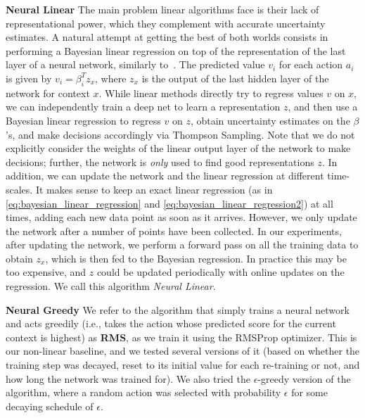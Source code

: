 \documentclass{article} \usepackage{iclr2018_conference,times}
\begin{document}
\textbf{Neural Linear}
The main problem linear algorithms face is their lack of representational power, which they complement with accurate uncertainty estimates.
A natural attempt at getting the best of both worlds consists in performing a Bayesian linear regression on top of the representation of the last layer of a neural network, similarly to~\cite{snoek2015}.
The predicted value $v_i$ for each action $a_i$ is given by $v_i = \beta_i^T z_x$, where $z_x$ is the output of the last hidden layer of the network for context $x$.
While linear methods directly try to regress values $v$ on $x$, we can independently train a deep net to learn a representation $z$, and then use a Bayesian linear regression to regress $v$ on $z$, obtain uncertainty estimates on the $\beta$'s, and make decisions accordingly via Thompson Sampling.
Note that we do not explicitly consider the weights of the linear output layer of the network to make decisions; further, the network is \emph{only} used to find good representations $z$.
In addition, we can update the network and the linear regression at different time-scales.
It makes sense to keep an exact linear regression (as in \eqref{eq:bayesian_linear_regression} and \eqref{eq:bayesian_linear_regression2}) at all times, adding each new data point as soon as it arrives.
However, we only update the network after a number of points have been collected.
In our experiments, after updating the network, we perform a forward pass on all the training data to obtain $z_x$, which is then fed to the Bayesian regression.
In practice this may be too expensive, and $z$ could be updated periodically with online updates on the regression.
We call this algorithm \emph{Neural Linear}.

\textbf{Neural Greedy}
We refer to the algorithm that simply trains a neural network and acts greedily (i.e., takes the action whose predicted score for the current context is highest) as \textbf{RMS}, as we train it using the RMSProp optimizer.
This is our non-linear baseline, and we tested several versions of it (based on whether the training step was decayed, reset to its initial value for each re-training or not, and how long the network was trained for).
We also tried the $\epsilon$-greedy version of the algorithm, where a random action was selected with probability $\epsilon$ for some decaying schedule of $\epsilon$.
\end{document}
